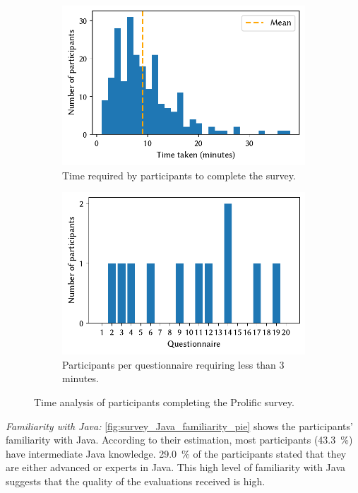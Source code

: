 \documentclass[%
class=scrreprt,
chapterprefix=false,%
open=right,%
twoside=true,%
paper=a4,%
logofile={Logo\_zentral\_farbig\_EN.png},%
thesistype=master,%
UKenglish,%
]{se2thesis}
\theoremstyle{definition}
\begin{document}
	\begin{figure}[tb]
		\centering
		\begin{subfigure}{0.49\textwidth}
			\includegraphics[width=\linewidth]{img/survey_time_histogramm.pdf}
			\caption{Time required by participants to complete the survey.}
			\label{fig:survey_time_histogramm}
		\end{subfigure}
		\hfill
		\begin{subfigure}{0.49\textwidth}
			\includegraphics[width=\linewidth]{img/survey_time_less_than_180.pdf}
			\caption{Participants per questionnaire requiring less than 3 minutes.}
			\label{fig:survey_time_less_than_180}
		\end{subfigure}
		\caption{Time analysis of participants completing the Prolific survey.}
		\label{fig:survey_time_prolific}
	\end{figure}
	
	\textit{Familiarity with Java:}
	\autoref{fig:survey_Java_familiarity_pie} shows the participants' familiarity with Java. According to their estimation, most participants (43.3~\%) have intermediate Java knowledge. 
	29.0~\% of the participants stated that they are either advanced or experts in Java. This high level of familiarity with Java suggests that the quality of the evaluations received is high.
	
\end{document}
